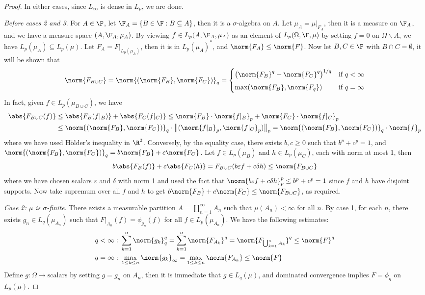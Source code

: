 \documentclass[a4paper]{article}
\begin{document}
\begin{proof}
	In either cases, since $L_\infty$ is dense in $L_p$, we are done.

	\emph{Before cases 2 and 3}. For $A\in\F$, let $\F_A=\{B\in\F:B\subseteq A\}$, then it is a $\sigma$-algebra on $A$. Let $\mu_A=\mu|_{F_A}$, then it is a measure on $\F_A$, and we have a measure space $(A,\F_A,\mu_A)$. By viewing $f\in L_p(A,\F_A,\mu_A)$ as an element of $L_p(\Omega,\F,\mu)$ by setting $f=0$ on $\Omega\backslash A$, we have $L_p(\mu_A)\subseteq L_p(\mu)$. Let $F_A=F|_{L_p(\mu_A)}$, then it is in $L_p(\mu_A)^*$, and $\norm{F_A}\leq\norm{F}$. Now let $B,C\in\F$ with $B\cap C=\emptyset$, it will be shown that
	\[
		\norm{F_{B\cup C}}=\norm{(\norm{F_B},\norm{F_C})}_q=
		\begin{cases}
  		\big(\norm{F_B}^q+\norm{F_C}^q\big)^{1/q} & \text{if }q<\infty\\[1ex]
	 	\max(\norm{F_B},\norm{F_q}) & \text{if }q=\infty
		\end{cases}
	\]
	In fact, given $f\in L_p(\mu_{B\cup C})$, we have
	\begin{align*}
  	\abs{F_{B\cup C}(f)}&\leq\abs{F_B(f|_B)}+\abs{F_C(f|_C)}\leq\norm{F_B}\cdot\norm{f|_B}_p+\norm{F_C}\cdot\norm{f|_C}_p\\
  	&\leq\norm{(\norm{F_B},\norm{F_C})}_q\cdot\big\|(\norm{f|_B}_p,\norm{f|_C}_p)\big\|_p=\norm{(\norm{F_B},\norm{F_C})}_q\cdot\norm{f}_p
	\end{align*}
	where we have used H\"older's inequality in $\R^2$. Conversely, by the equality case, there exists $b,c\geq 0$ such that $b^p+c^p=1$, and $\norm{(\norm{F_B},\norm{F_C})}_q=b\norm{F_B}+c\norm{F_C}$. Let $f\in L_p(\mu_B)$ and $h\in L_p(\mu_C)$, each with norm at most 1, then
	\[
	 b\abs{F_B(f)}+c\abs{F_C(h)}=F_{B\cup C}(b\varepsilon f+c\delta h)\leq\norm{F_{B\cup C}}
	\]
	where we have chosen scalars $\varepsilon$ and $\delta$ with norm 1 and used the fact that $\norm{b\varepsilon f+c\delta h}_p^p\leq b^p+c^p=1$ since $f$ and $h$ have disjoint supports. Now take supremum over all $f$ and $h$ to get $b\norm{F_B}+c\norm{F_C}\leq\norm{F_{B\cup C}}$, as required.

	\emph{Case 2: $\mu$ is $\sigma$-finite}. There exists a measurable partition $A=\coprod_{n=1}^\infty A_n$ such that $\mu(A_n)<\infty$ for all $n$. By case 1, for each $n$, there exists $g_n\in L_q(\mu_{A_n})$ such that $F|_{A_n}(f)=\phi_{g_n}(f)$ for all $f\in L_p(\mu_{A_n})$. We have the following estimates:
	\begin{align*}
  	q<\infty:&\ \sum_{k=1}^n\norm{g_k}_q^q=\sum_{k=1}^n\norm{F_{A_k}}^q= \norm{F_{\bigcup_{k=1}^n A_k}}^q\leq\norm{F}^q\\
  	q=\infty:&\ \max_{1\leq k\leq n}\norm{g_k}_\infty=\max_{1\leq k\leq n}\norm{F_{A_k}}\leq\norm{F}
	\end{align*}
	Define $g:\Omega\to\text{scalars}$ by setting $g=g_n$ on $A_n$, then it is immediate that $g\in L_q(\mu)$, and dominated convergence implies $F=\phi_g$ on $L_p(\mu)$.


\end{proof}
\end{document}
